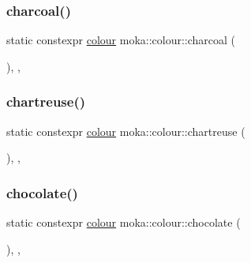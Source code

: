 \subsubsection{\texorpdfstring{charcoal()}{charcoal()}}
{\footnotesize\ttfamily static constexpr \mbox{\hyperlink{classmoka_1_1colour}{colour}} moka\+::colour\+::charcoal (\begin{DoxyParamCaption}{ }\end{DoxyParamCaption})\hspace{0.3cm}{\ttfamily [inline]}, {\ttfamily [static]}, {\ttfamily [noexcept]}}

\mbox{\label{classmoka_1_1colour_a98168a4da0885dd4c5c9a227be3474f0}} 
\subsubsection{\texorpdfstring{chartreuse()}{chartreuse()}}
{\footnotesize\ttfamily static constexpr \mbox{\hyperlink{classmoka_1_1colour}{colour}} moka\+::colour\+::chartreuse (\begin{DoxyParamCaption}{ }\end{DoxyParamCaption})\hspace{0.3cm}{\ttfamily [inline]}, {\ttfamily [static]}, {\ttfamily [noexcept]}}

\mbox{\label{classmoka_1_1colour_af979c0134340a8cc899217613406a7b9}} 
\subsubsection{\texorpdfstring{chocolate()}{chocolate()}}
{\footnotesize\ttfamily static constexpr \mbox{\hyperlink{classmoka_1_1colour}{colour}} moka\+::colour\+::chocolate (\begin{DoxyParamCaption}{ }\end{DoxyParamCaption})\hspace{0.3cm}{\ttfamily [inline]}, {\ttfamily [static]}, {\ttfamily [noexcept]}}

\mbox{\label{classmoka_1_1colour_a12c66d8c9645354719866e301fcaa29b}} 
